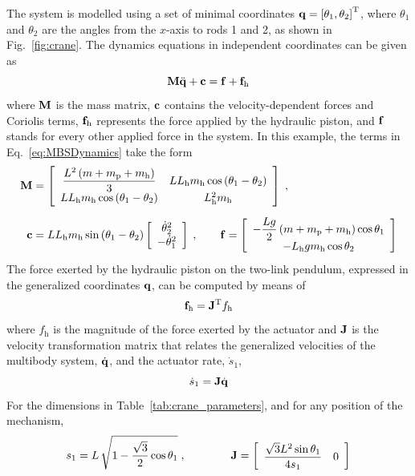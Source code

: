 \documentclass[fleqn,11pt]{article}
\newcommand{\plbr}[1]{ \left( #1 \right) }
\newcommand{\sqbr}[1]{ \left[ #1 \right] }
\newcommand{\matr}[2]{ \sqbr{\begin{array}{ #1 } #2 \end{array} }}
\newcommand{\trans}		{ ^{\rm T} }
\newcommand{\pos}		{ {\bf{q}} }
\newcommand{\vel}		{ {{\dot{\bf{q}}}} }
\newcommand{\acc}		{ {\ddot{\bf{q}}} }
\newcommand{\Mass}		{ {\bf{M}} }
\newcommand{\fCor}		{ {\bf{c}} }
\newcommand{\f}			{ {\bf{f}} }
\newcommand{\fh}		{ {\bf{f}_{\rm h}} }
\newcommand{\Jac}		{ {\bf J} }
\begin{document}
The system is modelled using a set of minimal coordinates $\pos = \sqbr{\theta_1,\theta_2}\trans$, where $\theta_1$ and $\theta_2$ are the angles from the $x$-axis to rods 1 and 2, as shown in Fig.~\ref{fig:crane}.
The dynamics equations in independent coordinates can be given as
\begin{equation}
	\Mass\acc + \fCor = \f + \fh
	\label{eq:MBSDynamics}
\end{equation}
where $\Mass$ is the mass matrix, $\fCor$ contains the velocity-dependent forces and Coriolis terms, $\fh$ represents the force applied by the hydraulic piston, and $\f$ stands for every other applied force in the system.
In this example, the terms in Eq.~\eqref{eq:MBSDynamics} take the form
\begin{align}
	\Mass &= \matr{cc}{
		\dfrac{L^2 \plbr{m+m_{\text{p}}+m_{\text{h}}}}{3} & LL_{\text{h}} m_{\text{h}} \cos\plbr{\theta_1-\theta_2} \\
		LL_{\text{h}} m_{\text{h}} \cos\plbr{\theta_1-\theta_2} & L_{\text{h}}^2 m_{\text{h}}
	}\;,
	\notag \\[2mm]
	\fCor &= LL_{\text{h}} m_{\text{h}} \sin\plbr{\theta_1 - \theta_2} 
	\matr{c}{\dot{\theta}_2^2 \\ -\dot{\theta}_1^2}
	\;, \quad\quad
	\f = \matr{c}{ 
		- \dfrac{Lg}{2}\plbr{m + m_{\text{p}} + m_{\text{h}}}\cos{\theta_1} \\
		- L_{\text{h}}gm_{\text{h}}\cos{\theta_2}
	}
\label{eq:MBSDynamicsExpr}
\end{align}
The force exerted by the hydraulic piston on the two-link pendulum, expressed in the generalized coordinates $\pos$, can be computed by means of
\begin{equation}
	\fh = \Jac\trans f_{\text{h}}
	\label{eq:HydroForce}
\end{equation}
where $f_{\text{h}}$ is the magnitude of the force exerted by the actuator and $\Jac$ is the velocity transformation matrix that relates the generalized velocities of the multibody system, $\vel$, and the actuator rate, $\dot{s}_1$, \cite{Kovecses2008}
\begin{equation}
	\dot{s}_1 = \Jac \vel
	\label{eq:velTransf}
\end{equation}
For the dimensions in Table~\ref{tab:crane_parameters}, and for any position of the mechanism,
\begin{equation}
	s_1 = L\, \sqrt{ 1 - \dfrac{\sqrt{3}}{2}\cos{\theta_1}} \;, \quad\quad\quad\quad  
	\Jac = \matr{cc}{\dfrac{\sqrt{3}L^2\sin{\theta_1}}{4s_1} &0}
	\label{eq:actLength}
\end{equation}
\end{document}
